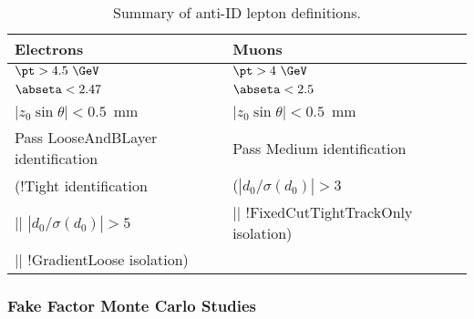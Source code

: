 \documentclass[11pt, oneside]{article}   	%
\begin{document}
\begin{table}[!htb]
\begin{center}
\begin{tabular}{l|l}
\hline
Electrons                                                                   & Muons \\
\hline
$\pt > 4.5~\GeV$                                                             & $\pt > 4~\GeV$ \\
$\abseta < 2.47$                                                            & $\abseta < 2.5$ \\
$|z_0\sin\theta| < 0.5$~mm                                                  & $|z_0\sin\theta| < 0.5$~mm \\
Pass LooseAndBLayer identification                                          & Pass Medium identification \\
\hline
(!Tight identification                                                     & ($|d_0/\sigma(d_0)| > 3$ \\
  $||$ $|d_0/\sigma(d_0)| > 5$                                   &  $||$ !FixedCutTightTrackOnly isolation) \\
  $||$ !GradientLoose isolation)                                            &  \\
\hline
\end{tabular}

\caption{Summary of anti-ID lepton definitions.}
\label{tab:antiIDLepDefs}
\end{center}
\end{table}

\subsubsection{Fake Factor Monte Carlo Studies}
\end{document}
